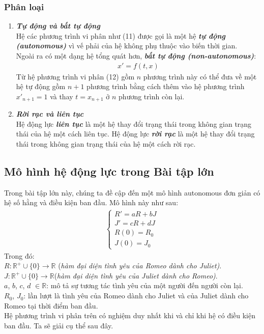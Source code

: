 \subsubsection{Phân loại}
\begin{enumerate}
    \item \textbf{\textit{Tự động và bất tự động}}\\
    Hệ các phương trình vi phân như (11) được gọi là một hệ \textbf{\textit{tự động (autonomous)}} vì vế phải của hệ không phụ thuộc vào biến thời gian.\\
    Ngoài ra có một dạng hệ tổng quát hơn, \textbf{\textit{bất tự động (non-autonomous)}}:
    \begin{align}
        x' = f(t,x)
    \end{align}
    Từ hệ phương trình vi phân (12) gồm $n$ phương trình này có thể đưa về một hệ tự động gồm $n+1$ phương trình bằng cách thêm vào hệ phương trình $x'_{n+1} = 1$ và thay $t=x_{n+1}$ ở $n$ phương trình còn lại.
    \item \textbf{\textit{Rời rạc và liên tục}}\\
    Hệ động lực \textbf{\textit{liên tục}} là một hệ thay đổi trạng thái trong không gian trạng thái của hệ một cách liên tục. Hệ động lực \textbf{\textit{rời rạc}} là một hệ thay đổi trạng thái trong không gian trạng thái của hệ một cách rời rạc.
\end{enumerate}
\subsection{Mô hình hệ động lực trong Bài tập lớn}
Trong bài tập lớn này, chúng ta đề cập đến một mô hình autonomous đơn giản có hệ số hằng và điều kiện ban đầu. Mô hình này như sau:
\begin{align}
    \begin{cases}
        R'=aR+bJ\\
        J'=cR+dJ\\
        R(0)=R_0\\
        J(0)=J_0
    \end{cases}
\end{align}
Trong đó:\\
$R:\mathbb{R^+}\cup\{0\}\to \mathbb{R}$ (\textit{hàm đại diện tình yêu của Romeo dành cho Juliet)}.\\
$J:\mathbb{R^+}\cup\{0\}\to \mathbb{R}$(\textit{hàm đại diện tình yêu của Juliet dành cho Romeo)}.\\
$a$, $b$, $c$, $d$ $\in\mathbb{R}$: mô tả sự tương tác tình yêu của một người đến người còn lại.\\
$R_0$, $J_0$: lần lượt là tình yêu của Romeo dành cho Juliet và của Juliet dành cho Romeo tại thời điểm ban đầu.\\
Hệ phương trình vi phân trên có nghiệm duy nhất khi và chỉ khi hệ có điều kiện ban đầu. Ta sẽ giải cụ thể sau đây.
